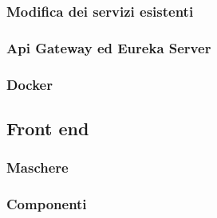\subsubsection{Modifica dei servizi esistenti}
\subsubsection{Api Gateway ed Eureka Server}
\subsubsection{Docker}

\subsection{Front end}
\subsubsection{Maschere}
\subsubsection{Componenti}